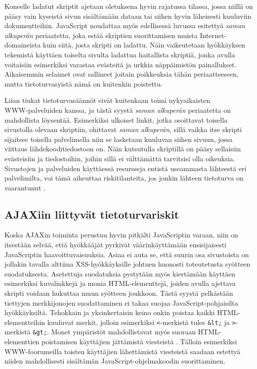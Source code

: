 Koneelle ladatut skriptit ajetaan oletuksena hyvin rajatussa tilassa,
jossa niillä on pääsy vain kyseistä sivun sisältämään dataan tai
siihen hyvin läheisesti kuuluviin dokumentteihin. JavaScript noudattaa
myös \ifdefined\seminaari \relax \else edellisessä luvussa esitettyä
\fi \emph{saman alkuperän} periaatetta, joka estää skriptien
suorittamisen muista In\-ter\-net-do\-mai\-neis\-ta kuin siitä, josta skripti on
ladattu. Näin vaikeutetaan hyökkäyksen tekemistä käyttäen
toiselta sivulta ladattua haitallista skriptiä, jonka avulla
voitaisiin esimerkiksi varastaa evästeitä ja urkkia näppäimistön
painallukset.  Aikaisemmin selaimet ovat sallineet joitain poikkeuksia
tähän periaatteeseen, mutta tietoturvasyistä nämä on kuitenkin
poistettu.

Liian tiukat tietoturvasäännöt eivät kuitenkaan toimi nykyaikaisten\\
WWW-palveluiden kanssa, ja tästä syystä \emph{saman alkuperän}
periaatetta on mahdollista löysentää. Esimerkiksi ulkoiset linkit,
jotka osoittavat toisella sivustolla olevaan skriptiin, ohittavat
\emph{saman alkuperän}, sillä vaikka itse skripti sijaitsee toisella
palvelimella niin se lasketaan kuuluvan siihen sivuun, jossa viittaus
lähdekooditiedostoon on.  Näin kutsutulla skriptillä on pääsy
sellaisiin evästeisiin ja tiedostoihin, joihin sillä ei välttämättä
tarvitsisi olla oikeuksia. Sivustojen ja palveluiden käyttäessä
resursseja entistä useammasta lähteestä eri palvelimilta, voi tämä
aiheuttaa riskitilanteita, jos jonkin lähteen tietoturva on
vaarantunut \cite{AJAX}.

\subsection{AJAXiin liittyvät tietoturvariskit}

Koska AJAXin toiminta perustuu hyvin pitkälti JavaScriptin varaan,
niin on itsestään selvää, että hyökkääjät pyrkivät väärinkäyttämään
ensisijaisesti JavaScriptin haavoittuvaisuuksia.  Asiaa ei auta se,
että suurin osa sivustoista on jollakin tavalla alttiina
XSS-hyök\-käyk\-sil\-le \cite{WEB2c} johtuen huonosti toteutetusta syötteen
suodatuksesta. Asetettuja suodatuksia pystytään myös kiertämään
käyttäen esimerkiksi kuvalinkkejä ja monia HTML-elementtejä,
joiden avulla ajettava skripti voidaan hukuttaa muun syötteen
joukkoon. Tästä syystä pelkästään tiettyjen merkkijonojen
suodattaminen ei takaa suojaa JavaScript-pohjaisilta
hyökkäyksiltä. Tehokkain ja yksinkertaisin keino onkin poistaa kaikki
HTML-e\-le\-ment\-tei\-hin kuuluvat merkit, jolloin esimerkiksi \texttt{<}-merkistä tulee
\texttt{\&lt;} ja \texttt{>}-merkistä \texttt{\&gt;}. Monet ympäristöt
mahdollistavat myös suoraan HTML-e\-le\-ment\-ti\-en poistamisen käyttäjien
jättämistä viesteistä \cite{AJAX}. Tälloin esimerkiksi WWW-foorumeilla
toisten käyttäjien lähettämistä viesteistä saadaan estettyä
niiden mahdollisesti sisältämän JavaScript-ohjelmakoodin suorittaminen.

